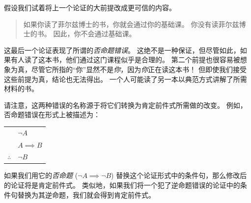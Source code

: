 假设我们试着将上一个论证的大前提改成更可信的内容。
\begin{quote}

如果你读了菲尔兹博士的书，你就会通过你的基础课。\newline
你没有读菲尔兹博士的书。\newline
因此，你不会通过基础课。
\end{quote}

这最后一个论证表现了所谓的\emph{否命题错误}。
这绝不是一种保证，但尽管如此，如果有人读了这本书，他们通过这门课程似乎是合理的。
第二个前提也很容易被想象为真，尽管它所指的“你”显然不是\emph{你}，因为\emph{你}正在读这本书！
但即使我们接受这些前提为真，结论也无法得出。
一个人可能读了另一本以典范方式讲解了所需材料的书。

请注意，这两种错误的名称源于将它们转换为肯定前件式所需做的改变。
例如，否命题错误在形式上被描述为：

\begin{center}
\begin{tabular}{cl}
 & ${\lnot}A$ \\
 & $A \implies B$ \\ \hline
$\therefore$ & ${\lnot}B$ \\
\end{tabular}
\end{center}

如果我们用它的{\em 否命题} (${\lnot}A \implies {\lnot}B$) 替换这个论证形式中的条件句，那么修改后的论证将是肯定前件式。
类似地，如果我们将一个犯了逆命题错误的论证中的条件句替换为其逆命题，我们就会得到肯定前件式。
\clearpage




%
%



